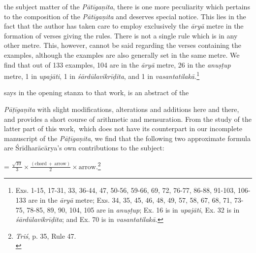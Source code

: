 \documentclass[10pt, openany]{book}
\begin{document}
{\vspace{0.3cm}{Besides the above-mentioned specialities which relate to}
{the subject matter of the \textit{Pātīgaṇita}, there is one more peculiarity
 which pertains to the composition of the \textit{Pātīgaṇita} and}
{deserves special notice. This lies in the fact that the}
{author has taken care to employ exclusively the \textit{āryā} metre in}
{the formation of verses giving the rules. There is not a single}
{rule which is in any other metre. This, however, cannot be}
{said regarding the verses containing the examples, although}
{the examples are also generally set in the same metre. We}
{find that out of 133 examples, 104 are in the \textit{āryā} metre, 26 in}
{the \textit{anuṣṭup} metre, 1 in\textit{ upajāti}, 1 in \textit{śārdūlavikrīḍita}, and
1 in}
\textit{vasantatilakā.}\renewcommand{\thefootnote}{1}\footnote{\hspace{-2mm} \englishfont Exs. 1-15, 17-31, 33, 36-44, 47, 50-56, 59-66, 69, 72, 76-77,
86-88,
91-103, 106-133 are in the \textit{āryā} metre;  Exs. 34, 35, 45, 46, 48, 49,
57, 58,
67, 68, 71, 73-75, 78-85, 89, 90, 104, 105 are in \textit{anuṣṭup}; Ex. 16
is in
\textit{upajāti}, Ex. 32 is in \textit{śārdūlavikrīḍita}; and Ex. 70 is in
\textit{vasantatilakā.}}

{says in the opening stanza to that work, is an abstract of the}

\newpage

\englishfont{}
{\textit{Pāṭīgaṇita} with slight modifications, alterations and additions}
{here and there, and provides a short course of arithmetic and}
{mensuration. From the study of the latter part of this work,~which does not have its counterpart in our incomplete}
{manuscript of the \textit{Pāṭīgaṇita}, we find that the following two}
{approximate formula are Śrīdharācārya's own contributions to the subject:}

\vspace{0.3cm}{(1) Area of the segment of a circle}
\vspace{1mm}

\hspace{1cm}= $\frac{\sqrt{10}}{3}\times {\frac{(\textrm{chord} \,+\, \textrm{arrow})}{2}}\times {\textrm{arrow}.}$\renewcommand{\thefootnote}{1}\footnote{\hspace{-2mm} \englishfont \textit{Triś}, p. 35, Rule 47.\\}

}
\end{document}

